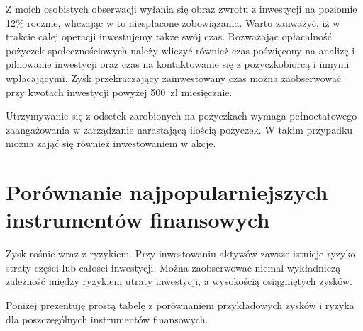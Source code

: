 \documentclass[a4paper,twoside,titlepage,openright]{book}
\begin{document}
Z moich osobistych obserwacji wyłania się obraz zwrotu z inwestycji na poziomie 12\% rocznie, wliczając w to niespłacone zobowiązania. Warto zauważyć, iż w trakcie całej operacji inwestujemy także swój czas. Rozważając opłacalność pożyczek społecznościowych należy wliczyć również czas poświęcony na analizę i pilnowanie inwestycji oraz czas na kontaktowanie się z pożyczkobiorcą i innymi wpłacającymi. Zysk przekraczający zainwestowany czas można zaobserwować przy kwotach inwestycji powyżej 500~zł miesięcznie. 

Utrzymywanie się z odsetek zarobionych na pożyczkach wymaga pełnoetatowego zaangażowania w zarządzanie narastającą ilością pożyczek. W takim przypadku można zająć się również inwestowaniem w akcje.


\section{Porównanie najpopularniejszych instrumentów finansowych}


Zysk rośnie wraz z ryzykiem. Przy inwestowaniu aktywów zawsze istnieje ryzyko straty części lub całości inwestycji. Można zaobserwować niemal wykładniczą zależność między ryzykiem utraty inwestycji, a wysokością osiągniętych zysków. 

Poniżej prezentuję prostą tabelę z porównaniem przykładowych zysków i ryzyka dla poszczególnych instrumentów finansowych. 

\begin{small}
\noindent
{}
\end{small}
\end{document}
